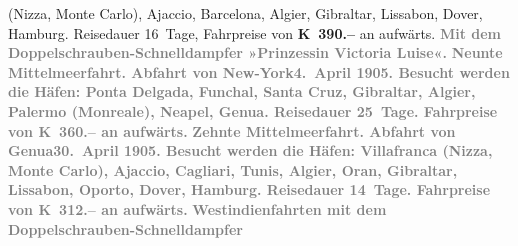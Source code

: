 \begin{ledgroupsized}[t]{13cm}
{{                     (Nizza, Monte Carlo), Ajaccio, Barcelona, Algier, Gibraltar, Lissabon, Dover, Hamburg. Reisedauer 16 Tage, Fahrpreise von \textbf{K 390.–} an aufwärts.}}\pend
           {\bigskip}\pstart
           \noindent{}\centering{}\textcolor{gray}{\textbf{Mit dem Doppelschrauben-Schnelldampfer »Prinzessin Victoria
                  Luise«.}}\pend
           \pstart
           \noindent{}\textcolor{gray}{\textbf{\textbf{Neunte Mittelmeerfahrt.}
                  Abfahrt von New-York\textbf{4. April 1905}. Besucht werden die Häfen: Ponta
                     Delgada, Funchal, Santa Cruz, Gibraltar, Algier, Palermo (Monreale),
                     Neapel, Genua. Reisedauer 25 Tage. Fahrpreise von \textbf{K 360.–} an
                  aufwärts.}}\pend
           \pstart
           \textcolor{gray}{\textbf{\textbf{Zehnte Mittelmeerfahrt.}
                  Abfahrt von Genua\textbf{30. April 1905}. Besucht werden die Häfen: Villafranca
                     (Nizza, Monte Carlo), Ajaccio, Cagliari, Tunis, Algier, Oran, Gibraltar, Lissabon, Oporto, Dover, Hamburg. Reisedauer 14 Tage. Fahrpreise von \textbf{K 312.–} an aufwärts.}}\pend
           {\bigskip}\pstart
           \noindent{}\centering{}\textcolor{gray}{\textbf{Westindienfahrten mit dem Doppelschrauben-Schnelldampfer
}}
\end{ledgroupsized}
